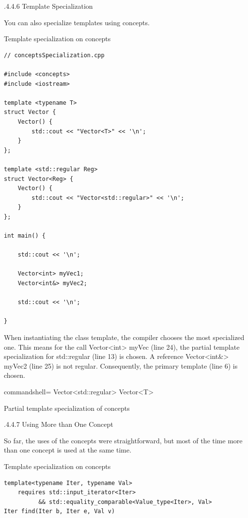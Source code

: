 .4.4.6\hspace{0.2cm} Template Specialization

You can also specialize templates using concepts.

\noindent
Template specialization on concepts
\begin{lstlisting}[style=styleCXX]
// conceptsSpecialization.cpp

#include <concepts>
#include <iostream>

template <typename T>
struct Vector {
	Vector() {
		std::cout << "Vector<T>" << '\n';
	}
};

template <std::regular Reg>
struct Vector<Reg> {
	Vector() {
		std::cout << "Vector<std::regular>" << '\n';
	}
};

int main() {
	
	std::cout << '\n';
	
	Vector<int> myVec1;
	Vector<int&> myVec2;
	
	std::cout << '\n';

}
\end{lstlisting}

When instantiating the class template, the compiler chooses the most specialized one. This means for the call Vector<int> myVec (line 24), the partial template specialization for std::regular (line 13) is chosen. A reference Vector<int\&> myVec2 (line 25) is not regular. Consequently, the primary template (line 6) is chosen.

\begin{tcblisting}{commandshell={}}
Vector<std::regular>
Vector<T>
\end{tcblisting}

\begin{center}
Partial template specialization of concepts
\end{center}

.4.4.7\hspace{0.2cm} Using More than One Concept

So far, the uses of the concepts were straightforward, but most of the time more than one concept is used at the same time.

\noindent
Template specialization on concepts
\begin{lstlisting}[style=styleCXX]
template<typename Iter, typename Val>
	requires std::input_iterator<Iter>
		  && std::equality_comparable<Value_type<Iter>, Val>
Iter find(Iter b, Iter e, Val v)
\end{lstlisting}

